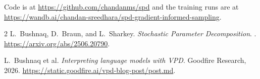 \documentclass[11pt]{article}
\begin{document}
Code is at \url{https://github.com/chandanms/spd} and the training runs are at
\url{https://wandb.ai/chandan-sreedhara/spd-gradient-informed-sampling}.

\begin{thebibliography}{2}
L.~Bushnaq, D.~Braun, and L.~Sharkey.
\newblock \emph{Stochastic Parameter Decomposition}.
. \url{https://arxiv.org/abs/2506.20790}.

L.~Bushnaq et al.
\newblock \emph{Interpreting language models with VPD}.
\newblock Goodfire Research, 2026.
\newblock \url{https://static.goodfire.ai/vpd-blog-post/post.md}.
\end{thebibliography}
\end{document}
